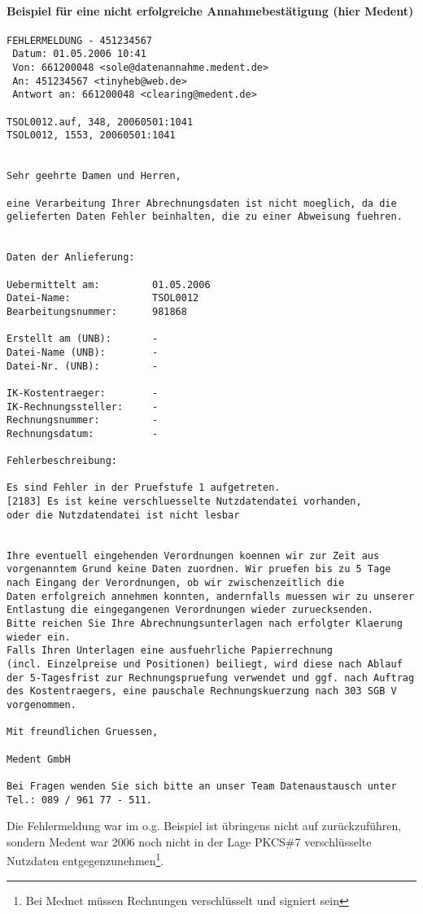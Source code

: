 \paragraph{Beispiel für eine nicht erfolgreiche Annahmebestätigung (hier Medent)}
\begin{verbatim}
FEHLERMELDUNG - 451234567
 Datum: 01.05.2006 10:41
 Von: 661200048 <sole@datenannahme.medent.de>
 An: 451234567 <tinyheb@web.de>
 Antwort an: 661200048 <clearing@medent.de>
 
TSOL0012.auf, 348, 20060501:1041
TSOL0012, 1553, 20060501:1041


Sehr geehrte Damen und Herren,

eine Verarbeitung Ihrer Abrechnungsdaten ist nicht moeglich, da die 
gelieferten Daten Fehler beinhalten, die zu einer Abweisung fuehren.


Daten der Anlieferung:

Uebermittelt am:         01.05.2006
Datei-Name:              TSOL0012
Bearbeitungsnummer:      981868

Erstellt am (UNB):       -
Datei-Name (UNB):        -
Datei-Nr. (UNB):         -

IK-Kostentraeger:        -
IK-Rechnungssteller:     -
Rechnungsnummer:         -
Rechnungsdatum:          -

Fehlerbeschreibung:

Es sind Fehler in der Pruefstufe 1 aufgetreten.
[2183] Es ist keine verschluesselte Nutzdatendatei vorhanden, 
oder die Nutzdatendatei ist nicht lesbar 


Ihre eventuell eingehenden Verordnungen koennen wir zur Zeit aus 
vorgenanntem Grund keine Daten zuordnen. Wir pruefen bis zu 5 Tage 
nach Eingang der Verordnungen, ob wir zwischenzeitlich die 
Daten erfolgreich annehmen konnten, andernfalls muessen wir zu unserer 
Entlastung die eingegangenen Verordnungen wieder zuruecksenden. 
Bitte reichen Sie Ihre Abrechnungsunterlagen nach erfolgter Klaerung 
wieder ein.
Falls Ihren Unterlagen eine ausfuehrliche Papierrechnung 
(incl. Einzelpreise und Positionen) beiliegt, wird diese nach Ablauf 
der 5-Tagesfrist zur Rechnungspruefung verwendet und ggf. nach Auftrag 
des Kostentraegers, eine pauschale Rechnungskuerzung nach 303 SGB V 
vorgenommen.

Mit freundlichen Gruessen,

Medent GmbH

Bei Fragen wenden Sie sich bitte an unser Team Datenaustausch unter 
Tel.: 089 / 961 77 - 511.
\end{verbatim}
Die Fehlermeldung war im o.g. Beispiel ist übringens nicht auf \tinyHeb\/ 
zurückzuführen, sondern Medent war 2006 noch nicht in der Lage PKCS\#7
verschlüsselte Nutzdaten entgegenzunehmen\footnote{Bei Mednet müssen
Rechnungen verschlüsselt und signiert sein}.

